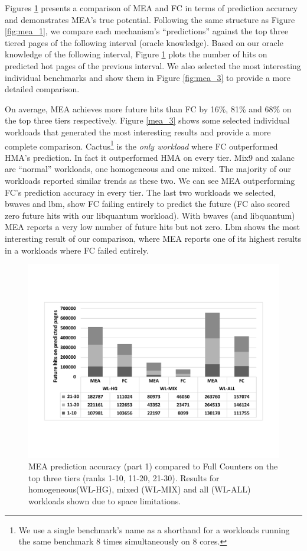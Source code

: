 Figures \ref{fig:mea_2} presents a comparison of MEA and FC in terms of prediction accuracy and demonstrates MEA's true potential. Following the same structure as Figure \ref{fig:mea_1}, we compare each mechanism's ``predictions'' against the top three tiered pages of the following interval (oracle knowledge). Based on our oracle knowledge of the following interval, Figure \ref{fig:mea_2} plots the number of hits on predicted hot pages of the previous interval. We also selected the most interesting individual benchmarks and show them in Figure \ref{fig:mea_3} to provide a more detailed comparison. 

On average, MEA achieves more future hits than FC by 16\%, 81\% and 68\% on the top three tiers respectively. Figure \ref{mea_3} shows some selected individual workloads that generated the most interesting results and provide a more complete comparison. Cactus\footnote{We use a single benchmark's name as a shorthand for a workloads running the same benchmark 8 times simultaneously on 8 cores.} is the \textit{only workload} where FC outperformed HMA's prediction. In fact it outperformed HMA on every tier. Mix9 and xalanc are ``normal'' workloads, one homogeneous and one mixed. The majority of our workloads reported similar trends as these two. We can see MEA outperforming FC's prediction accuracy in every tier. The last two workloads we selected, bwaves and lbm, show FC failing entirely to predict the future (FC also scored zero future hits with our libquantum workload). With bwaves (and libquantum) MEA reports a very low number of future hits but not zero. Lbm shows the most interesting result of our comparison, where MEA reports one of its highest results in a workloads where FC failed entirely.

\begin{figure}[t]
\centering
  \includegraphics[scale=.3]{figures/mea_2_v2.pdf}
  \caption{MEA prediction accuracy (part 1) compared to Full Counters on the top three tiers (ranks 1-10, 11-20, 21-30). Results for homogeneous(WL-HG), mixed (WL-MIX) and all (WL-ALL) workloads shown due to space limitations.}
  \label{fig:mea_2}
\end{figure}


